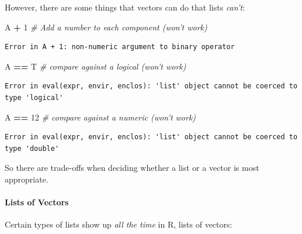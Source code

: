 \documentclass[
]{article}
\newenvironment{Shaded}{\begin{snugshade}}{\end{snugshade}}
\newcommand{\CommentTok}[1]{\textcolor[rgb]{0.56,0.35,0.01}{\textit{#1}}}
\newcommand{\DecValTok}[1]{\textcolor[rgb]{0.00,0.00,0.81}{#1}}
\newcommand{\NormalTok}[1]{#1}
\newcommand{\OperatorTok}[1]{\textcolor[rgb]{0.81,0.36,0.00}{\textbf{#1}}}
\newcommand{\StringTok}[1]{\textcolor[rgb]{0.31,0.60,0.02}{#1}}
\begin{document}
However, there are some things that vectors can do that lists \emph{can't}:

\begin{Shaded}
\begin{Highlighting}[]
\NormalTok{A }\OperatorTok{+}\StringTok{ }\DecValTok{1}  \CommentTok{# Add a number to each component (won't work)}
\end{Highlighting}
\end{Shaded}

\begin{verbatim}
Error in A + 1: non-numeric argument to binary operator
\end{verbatim}

\begin{Shaded}
\begin{Highlighting}[]
\NormalTok{A }\OperatorTok{==}\StringTok{ }\NormalTok{T  }\CommentTok{# compare against a logical (won't work)}
\end{Highlighting}
\end{Shaded}

\begin{verbatim}
Error in eval(expr, envir, enclos): 'list' object cannot be coerced to type 'logical'
\end{verbatim}

\begin{Shaded}
\begin{Highlighting}[]
\NormalTok{A }\OperatorTok{==}\StringTok{ }\DecValTok{12}  \CommentTok{# compare against a numeric (won't work)}
\end{Highlighting}
\end{Shaded}

\begin{verbatim}
Error in eval(expr, envir, enclos): 'list' object cannot be coerced to type 'double'
\end{verbatim}

So there are trade-offs when deciding whether a list or a vector is most appropriate.

\hypertarget{lists-of-vectors}{%
\paragraph{Lists of Vectors}\label{lists-of-vectors}}

Certain types of lists show up \emph{all the time} in R, lists of vectors:
\end{document}
